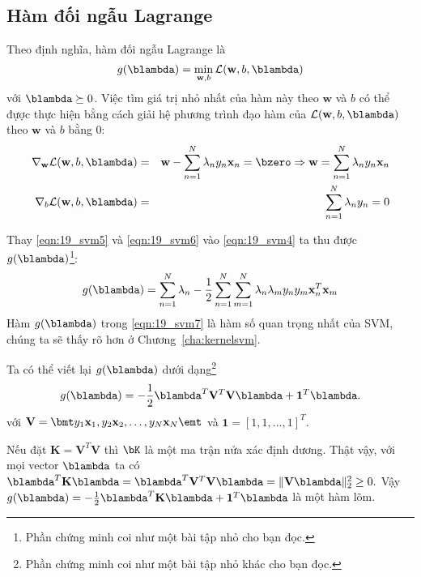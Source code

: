 \subsection{Hàm đối ngẫu Lagrange}
Theo định nghĩa, hàm đối ngẫu Lagrange là 
\begin{equation*} 
g(\blambda) = \min_{\mathbf{w}, b} \mathcal{L}(\mathbf{w}, b, \blambda)  
\end{equation*} 
với $\blambda \succeq 0$. Việc tìm giá trị nhỏ nhất của hàm này theo $\mathbf{w}$
và $b$ có thể đựợc thực hiện bằng cách giải hệ phương trình đạo hàm của $\mathcal{L}(\mathbf{w}, b, \blambda)$ theo $\mathbf{w}$ và $b$ bằng 0:
\begin{eqnarray} 
\label{eqn:19_svm5}
\nabla_{\mathbf{w}}\mathcal{L}(\mathbf{w}, b, \blambda) &=&
\mathbf{w} - \sum_{n=1}^N \lambda_n y_n \mathbf{x}_n = \bzero \Rightarrow
\mathbf{w} = \sum_{n=1}^N \lambda_n y_n \mathbf{x}_n \\\ 
\label{eqn:19_svm6}
\nabla_{b}\mathcal{L}(\mathbf{w}, b, \blambda) &=&  
\sum_{n=1}^N \lambda_ny_n = 0 
\end{eqnarray} 
 
Thay \eqref{eqn:19_svm5} và \eqref{eqn:19_svm6} vào \eqref{eqn:19_svm4} ta thu
được $g(\blambda)$\footnote{Phần chứng minh coi như một bài tập nhỏ cho bạn
đọc.}:
\begin{equation} 
\label{eqn:19_svm7}
g(\blambda) = \sum_{n=1}^N \lambda_n  -\frac{1}{2}\sum_{n=1}^N \sum_{m=1}^N \lambda_n\lambda_m y_n y_m \mathbf{x}_n^T\mathbf{x}_m
\end{equation} 
Hàm $g(\blambda)$ trong \eqref{eqn:19_svm7} {là hàm số quan trọng nhất
của SVM}, chúng ta sẽ thấy rõ hơn ở Chương~\ref{cha:kernelsvm}.


Ta có thể viết lại $g(\blambda)$
dưới dạng\footnote{Phần chứng minh coi như một bài tập nhỏ khác cho bạn đọc.}
\begin{equation} 
\label{eqn:19_svm8}
g(\blambda) = -\frac{1}{2}\blambda^T\mathbf{V}^T\mathbf{V}\mathbf{\blambda} + \mathbf{1}^T\blambda.
\end{equation} 
với 
\begin{math} 
    \mathbf{V} = \bmt y_1 \mathbf{x}_1, y_2 \mathbf{x}_2, \dots, y_N \mathbf{x}_N \emt 
\end{math} 
và $\mathbf{1} = [1, 1, \dots, 1]^T$.

Nếu đặt $\mathbf{K} = \mathbf{V}^T\mathbf{V}$ thì $\bK$ là một ma trận nửa xác
định dương. Thật vậy, với mọi vector $\blambda$ ta có $\blambda^T\mathbf{K}\mathbf{\blambda} = \blambda^T\mathbf{V}^T\mathbf{V}\mathbf{\blambda} = \|\mathbf{V}\blambda\|_2^2 \geq 0.$
Vậy $g(\blambda) = -\frac{1}{2}\blambda^T\mathbf{K}\mathbf{\blambda} + \mathbf{1}^T\blambda$ là một hàm lõm. 
 
